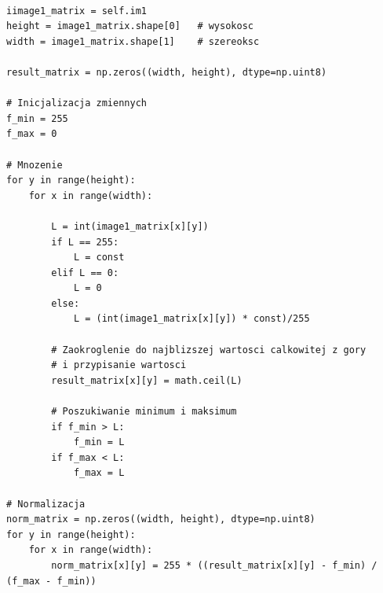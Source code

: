 \documentclass[final,a4paper,openany,12pt]{mwbk}
\begin{document}
\begin{lstlisting}[caption=Mnożenie obrazu szarego przez zadaną liczbę]

iimage1_matrix = self.im1
height = image1_matrix.shape[0]   # wysokosc
width = image1_matrix.shape[1]    # szereoksc

result_matrix = np.zeros((width, height), dtype=np.uint8)

# Inicjalizacja zmiennych
f_min = 255
f_max = 0

# Mnozenie 
for y in range(height):
    for x in range(width):  

        L = int(image1_matrix[x][y]) 
        if L == 255:
            L = const
        elif L == 0:
            L = 0
        else:
            L = (int(image1_matrix[x][y]) * const)/255 

        # Zaokroglenie do najblizszej wartosci calkowitej z gory
        # i przypisanie wartosci
        result_matrix[x][y] = math.ceil(L)

        # Poszukiwanie minimum i maksimum
        if f_min > L:
            f_min = L
        if f_max < L:
            f_max = L

# Normalizacja
norm_matrix = np.zeros((width, height), dtype=np.uint8)
for y in range(height):
    for x in range(width):
        norm_matrix[x][y] = 255 * ((result_matrix[x][y] - f_min) / (f_max - f_min))

\end{lstlisting}
\end{document}
